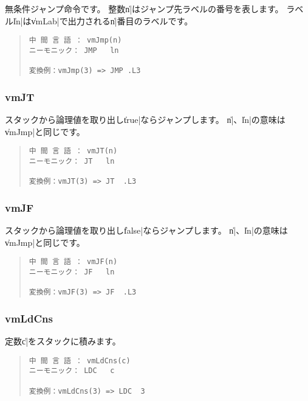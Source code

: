 無条件ジャンプ命令です。
整数\|n|はジャンプ先ラベルの番号を表します。
ラベル\|ln|は\|vmLab|で出力される\|n|番目のラベルです。

\begin{quote}
\begin{verbatim}
中 間 言 語 ： vmJmp(n)
ニーモニック： JMP   ln

変換例：vmJmp(3) => JMP .L3
\end{verbatim}
\end{quote}

\subsubsection{vmJT}

スタックから論理値を取り出し\|true|ならジャンプします。
\|n|、\|ln|の意味は\|vmJmp|と同じです。

\begin{quote}
\begin{verbatim}
中 間 言 語 ： vmJT(n)
ニーモニック： JT   ln

変換例：vmJT(3) => JT  .L3
\end{verbatim}
\end{quote}

\subsubsection{vmJF}

スタックから論理値を取り出し\|false|ならジャンプします。
\|n|、\|ln|の意味は\|vmJmp|と同じです。

\begin{quote}
\begin{verbatim}
中 間 言 語 ： vmJF(n)
ニーモニック： JF   ln

変換例：vmJF(3) => JF  .L3
\end{verbatim}
\end{quote}

\subsubsection{vmLdCns}

定数\|c|をスタックに積みます。

\begin{quote}
\begin{verbatim}
中 間 言 語 ： vmLdCns(c)
ニーモニック： LDC   c

変換例：vmLdCns(3) => LDC  3
\end{verbatim}
\end{quote}

